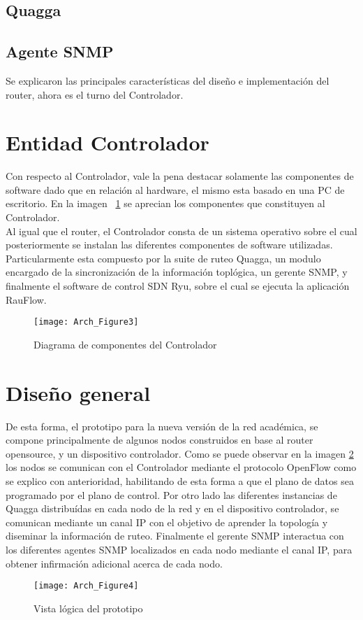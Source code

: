 \subsection{Quagga}

\subsection{Agente SNMP}

Se explicaron las principales caracter\'isticas del dise\~no e implementaci\'on del router, ahora es el turno del Controlador.

\section{Entidad Controlador}
Con respecto al Controlador, vale la pena destacar solamente las componentes de software dado que en relaci\'on al hardware, el mismo esta basado en una PC de escritorio. En la imagen ~\ref{fig:OpenSourceRArch3} se aprecian los componentes que constituyen al Controlador.\\

Al igual que el router, el Controlador consta de un sistema operativo sobre el cual posteriormente se instalan las diferentes componentes de software utilizadas. Particularmente esta compuesto por la suite de ruteo Quagga, un modulo encargado de la sincronizaci\'on de la informaci\'on topl\'ogica, un gerente SNMP, y finalmente el software de control SDN Ryu, sobre el cual se ejecuta la aplicaci\'on RauFlow.

\begin{figure}[htbp!] 
\centering    
\texttt{[image: Arch\_Figure3]}
\caption[OpenSourceRArch3]{Diagrama de componentes del Controlador}
\label{fig:OpenSourceRArch3}
\end{figure}

\section{Dise\~no general}

De esta forma, el prototipo para la nueva versi\'on de la red acad\'emica, se compone principalmente de algunos nodos construidos en base al router opensource, y un dispositivo controlador. Como se puede observar en la imagen \ref{fig:OpenSourceRArch4} los nodos se comunican con el Controlador mediante el protocolo OpenFlow como se explico con anterioridad, habilitando de esta forma a que el plano de datos sea programado por el plano de control. Por otro lado las diferentes instancias de Quagga distribu\'idas en cada nodo de la red y en el dispositivo controlador, se comunican mediante un canal IP con el objetivo de aprender la topolog\'ia y diseminar la informaci\'on de ruteo. Finalmente el gerente SNMP interactua con los diferentes agentes SNMP localizados en cada nodo mediante el canal IP, para obtener infirmaci\'on adicional acerca de cada nodo. 

\begin{figure}[htbp!] 
\centering    
\texttt{[image: Arch\_Figure4]}
\caption[OpenSourceRArch4]{Vista l\'ogica del prototipo}
\label{fig:OpenSourceRArch4}
\end{figure}